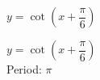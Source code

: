 {$y = \cot \left( x + \dfrac{\pi}{6} \right)$}
{$y = \cot \left( x + \dfrac{\pi}{6} \right)$\\
Period: $\pi$

\begin{center}
\end{center}
}
